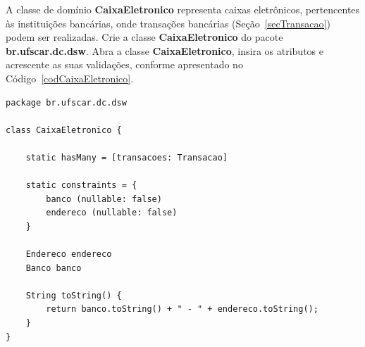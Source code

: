 \vspace{0.5cm}


A  classe  de  domínio  {\bf  CaixaEletronico}  representa  caixas  eletrônicos,
pertencentes    às   instituições    bancárias,   onde    transações   bancárias
(Seção~\ref{secTransacao})   podem   ser  realizadas.    Crie   a  classe   {\bf
  CaixaEletronico}  do  pacote  {\bf  br.ufscar.dc.dsw}.   Abra  a  classe  {\bf
  CaixaEletronico},  insira  os  atributos  e  acrescente  as  suas  validações,
conforme apresentado no Código~\ref{codCaixaEletronico}. 

\begin{lstlisting}[caption=Classe  de  domínio  {\bf CaixaEletronico},  frame  =
    trBL, float=htbp, label=codCaixaEletronico] 
package br.ufscar.dc.dsw

class CaixaEletronico {

    static hasMany = [transacoes: Transacao]
    
    static constraints = {
        banco (nullable: false)
        endereco (nullable: false)
    }
    
    Endereco endereco
    Banco banco
    
    String toString() {
        return banco.toString() + " - " + endereco.toString();
    }
}
\end{lstlisting}

\hspace{1cm}\\
\hspace{1cm}\\


